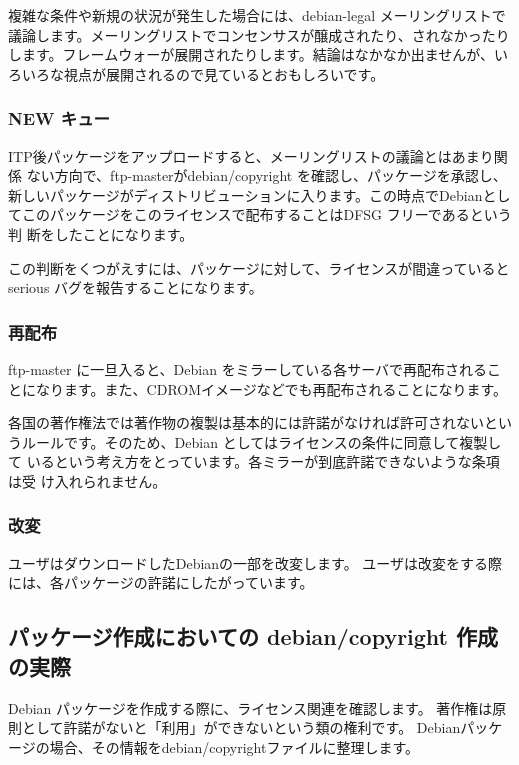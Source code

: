 \documentclass[mingoth,a4paper]{jsarticle}
\begin{document}
複雑な条件や新規の状況が発生した場合には、debian-legal メーリングリストで
議論します。メーリングリストでコンセンサスが醸成されたり、されなかったり
します。フレームウォーが展開されたりします。結論はなかなか出ませんが、い
ろいろな視点が展開されるので見ているとおもしろいです。

\subsubsection{NEW キュー}

ITP後パッケージをアップロードすると、メーリングリストの議論とはあまり関係
ない方向で、ftp-masterがdebian/copyright を確認し、パッケージを承認し、
新しいパッケージがディストリビューションに入ります。この時点でDebianとし
てこのパッケージをこのライセンスで配布することはDFSG フリーであるという判
断をしたことになります。

この判断をくつがえすには、パッケージに対して、ライセンスが間違っていると
serious バグを報告することになります。

\subsubsection{再配布}

ftp-master に一旦入ると、Debian をミラーしている各サーバで再配布されるこ
とになります。また、CDROMイメージなどでも再配布されることになります。

各国の著作権法では著作物の複製は基本的には許諾がなければ許可されないとい
うルールです。そのため、Debian としてはライセンスの条件に同意して複製して
いるという考え方をとっています。各ミラーが到底許諾できないような条項は受
け入れられません。

\subsubsection{改変}

ユーザはダウンロードしたDebianの一部を改変します。
ユーザは改変をする際には、各パッケージの許諾にしたがっています。

\subsection{パッケージ作成においての debian/copyright 作成の実際}

Debian パッケージを作成する際に、ライセンス関連を確認します。
著作権は原則として許諾がないと「利用」ができないという類の権利です。
Debianパッケージの場合、その情報をdebian/copyrightファイルに整理します。
\end{document}
